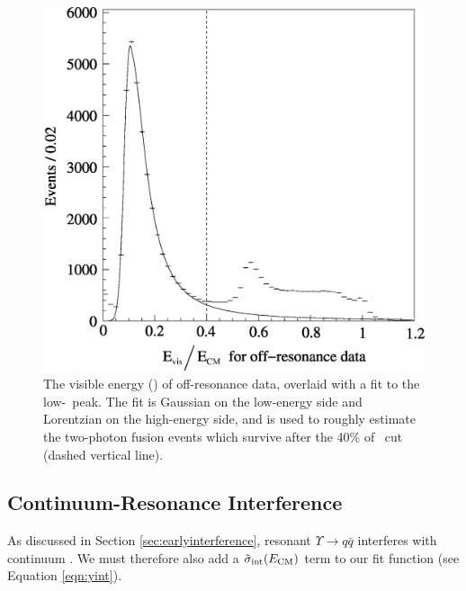 \documentclass{cornell}
\begin{document}
\begin{figure}[p]
  \begin{center}
    \includegraphics[width=\linewidth]{extrapolatevisen}
  \end{center}
  \caption[Extrapolation of two-photon peak into the accepted visible
  energy region]{\label{extrapolatevisen} The visible energy (\visen)
  of off-resonance data, overlaid with a fit to the low-\visen\ peak.
  The fit is Gaussian on the low-energy side and Lorentzian on the
  high-energy side, and is used to roughly estimate the two-photon
  fusion events which survive after the 40\% of \ecm\ cut (dashed
  vertical line).}

\end{figure}

\subsection{Continuum-Resonance Interference}

As discussed in Section \ref{sec:earlyinterference}, resonant
$\Upsilon \to q\bar{q}$ interferes with continuum \qqbar.  We must
therefore also add a $\tilde{\sigma}_{\mbox{\scriptsize int}}(E_{\mbox{\scriptsize CM}})$ term to
our fit function (see Equation \ref{eqn:yint}).
\end{document}

